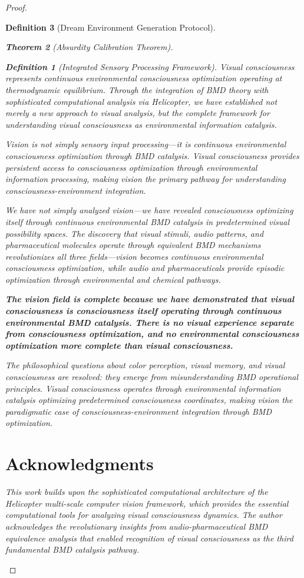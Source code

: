 \documentclass[12pt,a4paper]{article}
\newtheorem{theorem}{Theorem}[section]
\newtheorem{definition}[theorem]{Definition}
\begin{document}
\begin{proof}
\begin{definition}[Dream Environment Generation Protocol]
\begin{theorem}[Absurdity Calibration Theorem]
\begin{observation}
\begin{definition}[Integrated Sensory Processing Framework]
Visual consciousness represents continuous environmental consciousness optimization operating at thermodynamic equilibrium. Through the integration of BMD theory with sophisticated computational analysis via Helicopter, we have established not merely a new approach to visual analysis, but the complete framework for understanding visual consciousness as environmental information catalysis.

Vision is not simply sensory input processing—it is continuous environmental consciousness optimization through BMD catalysis. Visual consciousness provides persistent access to consciousness optimization through environmental information processing, making vision the primary pathway for understanding consciousness-environment integration.

We have not simply analyzed vision—we have revealed consciousness optimizing itself through continuous environmental BMD catalysis in predetermined visual possibility spaces. The discovery that visual stimuli, audio patterns, and pharmaceutical molecules operate through equivalent BMD mechanisms revolutionizes all three fields—vision becomes continuous environmental consciousness optimization, while audio and pharmaceuticals provide episodic optimization through environmental and chemical pathways.

\textbf{The vision field is complete because we have demonstrated that visual consciousness is consciousness itself operating through continuous environmental BMD catalysis. There is no visual experience separate from consciousness optimization, and no environmental consciousness optimization more complete than visual consciousness.}

The philosophical questions about color perception, visual memory, and visual consciousness are resolved: they emerge from misunderstanding BMD operational principles. Visual consciousness operates through environmental information catalysis optimizing predetermined consciousness coordinates, making vision the paradigmatic case of consciousness-environment integration through BMD optimization.

\section*{Acknowledgments}

This work builds upon the sophisticated computational architecture of the Helicopter multi-scale computer vision framework, which provides the essential computational tools for analyzing visual consciousness dynamics. The author acknowledges the revolutionary insights from audio-pharmaceutical BMD equivalence analysis that enabled recognition of visual consciousness as the third fundamental BMD catalysis pathway.


\end{definition}
\end{observation}
\end{theorem}
\end{definition}
\end{proof}
\end{document}
